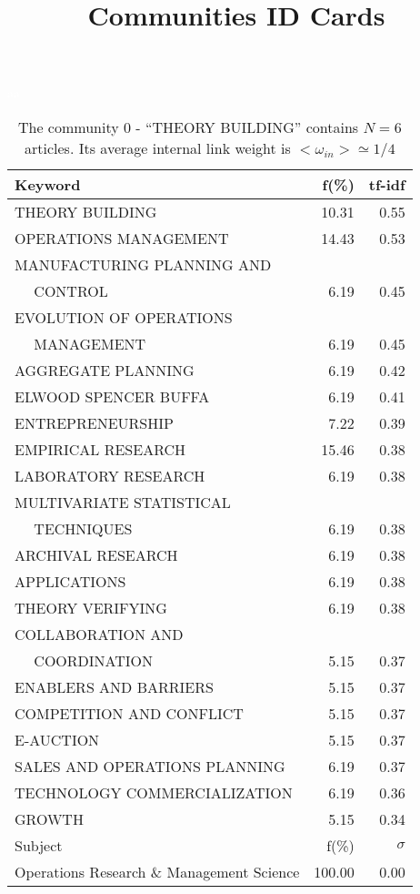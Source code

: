 \documentclass[a4paper,11pt]{report}
\title{{\bf Communities ID Cards}}
\date{\begin{flushleft}This document gather the ``ID Cards'' of the CC communities found within your database.\\
 The CC network was built by keeping a link between articles sharing at least 5 references. The communities characterized here correspond to the ones found in the level 1 (in the sense of the Louvain algo) which gathers more than 0 articles.\\
 These ID cards displays the most frequent keywords, subject categories, journals of publication, institution, countries, authors, references and reference journals of the articles of each community. The significance of an item $\sigma = \sqrt{N} (f - p) / \sqrt{p(1-p)}$ [where $N$ is the number of articles within the community and $f$ and $p$ are the proportion of articles respectively within the community and within the database displaying that item ] is also given (for example $\sigma > 5$ is really highly significant). The tf-idf value which can be calculated by $tf-idf = f*log(frac{1}{p})$ is also given.\\
\vspace{1cm}
\copyright Sebastian Grauwin, Liu Weizhi - (2014) \end{flushleft}}
\begin{document}
\begin{landscape}
\maketitle
\clearpage

\begin{table}[!ht]
\caption{The community 0 - ``THEORY BUILDING'' contains $N = 6$ articles. Its average internal link weight is $<\omega_{in}> \simeq 1/4$ }
\textcolor{white}{aa}\\
{\scriptsize\begin{tabular}{|l r  r|}
\hline
Keyword & f(\%) & tf-idf \\
\hline
THEORY BUILDING & 10.31 & 0.55\\
OPERATIONS MANAGEMENT & 14.43 & 0.53\\
MANUFACTURING PLANNING AND &  &\\
$\quad$ CONTROL & 6.19 & 0.45\\
EVOLUTION OF OPERATIONS &  &\\
$\quad$ MANAGEMENT & 6.19 & 0.45\\
AGGREGATE PLANNING & 6.19 & 0.42\\
ELWOOD SPENCER BUFFA & 6.19 & 0.41\\
ENTREPRENEURSHIP & 7.22 & 0.39\\
EMPIRICAL RESEARCH & 15.46 & 0.38\\
LABORATORY RESEARCH & 6.19 & 0.38\\
MULTIVARIATE STATISTICAL &  &\\
$\quad$ TECHNIQUES & 6.19 & 0.38\\
ARCHIVAL RESEARCH & 6.19 & 0.38\\
APPLICATIONS & 6.19 & 0.38\\
THEORY VERIFYING & 6.19 & 0.38\\
COLLABORATION AND &  &\\
$\quad$ COORDINATION & 5.15 & 0.37\\
ENABLERS AND BARRIERS & 5.15 & 0.37\\
COMPETITION AND CONFLICT & 5.15 & 0.37\\
E-AUCTION & 5.15 & 0.37\\
SALES AND OPERATIONS PLANNING & 6.19 & 0.37\\
TECHNOLOGY COMMERCIALIZATION & 6.19 & 0.36\\
GROWTH & 5.15 & 0.34\\
\hline
\hline
Subject & f(\%) & $\sigma$\\
\hline
Operations Research \& Management Science & 100.00 & 0.00\\

\end{tabular}}
\end{table}
\end{landscape}
\end{document}
